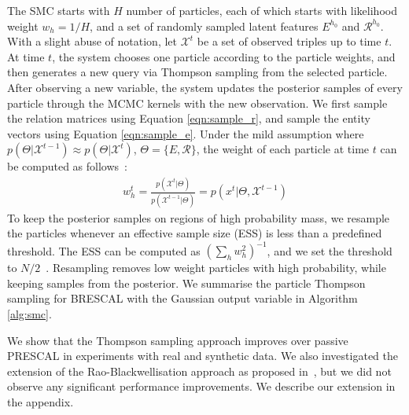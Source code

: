 The SMC starts with $H$ number of particles, each of which starts with likelihood
weight $w_{h} = 1/H$, and a set of randomly sampled latent features $E^{h_0}$ and $\mathcal{R}^{h_0}$.
With a slight abuse of notation, let $\mathcal{X}^{t}$ be a set of observed triples up to time $t$.
At time $t$, the system chooses one particle according to the particle weights,
and then generates a new query via Thompson sampling from the selected particle.
After observing a new variable, the system updates the posterior samples of
every particle through the MCMC kernels with the new observation.
We first sample the relation matrices using Equation \ref{eqn:sample_r}, and sample the entity vectors using Equation \ref{eqn:sample_e}.
Under the mild assumption where
$p(\Theta | \mathcal{X}^{t-1}) \approx p(\Theta | \mathcal{X}^{t})$, $\Theta = \{E, \mathcal{R}\}$,
the weight of each particle at time $t$ can be computed as follows~\cite{del2006sequential,chopin2002sequential}:
\begin{align}
w_{h}^{t} = \frac{p(\mathcal{X}^{t} | \Theta)}{p(\mathcal{X}^{t-1} | \Theta)}
 = p(x^{t} | \Theta, \mathcal{X}^{t-1})
\end{align}
To keep the posterior samples
on regions of high probability mass, we resample the particles whenever
an effective sample size (ESS) is less than a predefined threshold.
The ESS can be computed as $(\sum_h w_h^2)^{-1}$, and we set the threshold
to $N/2$~\cite{Doucet2011}. Resampling removes low weight particles with high probability,
while keeping samples from the posterior.
We summarise the particle Thompson sampling for BRESCAL with the
Gaussian output variable in Algorithm \ref{alg:smc}.

We show that the Thompson sampling approach improves over passive PRESCAL in
experiments with real and synthetic data.
We also investigated the extension of the Rao-Blackwellisation approach as proposed
in~\cite{kawale2015efficient}, but we did not observe any significant performance improvements.
We describe our extension in the appendix.

%

